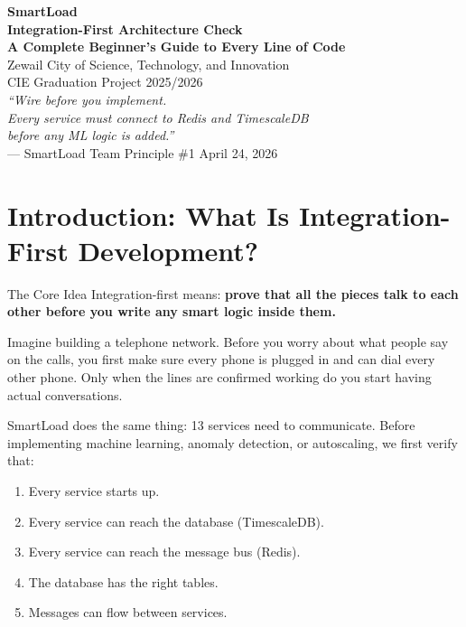 \documentclass[12pt, a4paper]{article}
\begin{document}
\begin{titlepage}
  \centering
  \vspace*{2cm}
  {\Huge\bfseries SmartLoad\\[0.4em]
   \Large Integration-First Architecture Check\\[0.3em]
   \normalsize A Complete Beginner's Guide to Every Line of Code}\\[2cm]
  {\large Zewail City of Science, Technology, and Innovation\\
   CIE Graduation Project 2025/2026\\[1.5cm]}
  {\large\itshape ``Wire before you implement.\\
   Every service must connect to Redis and TimescaleDB\\
   before any ML logic is added.''}\\[0.5em]
  {\small --- SmartLoad Team Principle \#1}
  \vfill
  {\large April 24, 2026}
\end{titlepage}

\tableofcontents
\newpage

\section{Introduction: What Is Integration-First Development?}

\begin{conceptbox}{The Core Idea}
Integration-first means: \textbf{prove that all the pieces talk to each other
before you write any smart logic inside them.}

Imagine building a telephone network. Before you worry about what people say on
the calls, you first make sure every phone is plugged in and can dial every
other phone. Only when the lines are confirmed working do you start having
actual conversations.

SmartLoad does the same thing: 13 services need to communicate. Before
implementing machine learning, anomaly detection, or autoscaling, we first
verify that:
\begin{enumerate}
  \item Every service starts up.
  \item Every service can reach the database (TimescaleDB).
  \item Every service can reach the message bus (Redis).
  \item The database has the right tables.
  \item Messages can flow between services.
\end{enumerate}
\end{conceptbox}
\end{document}
